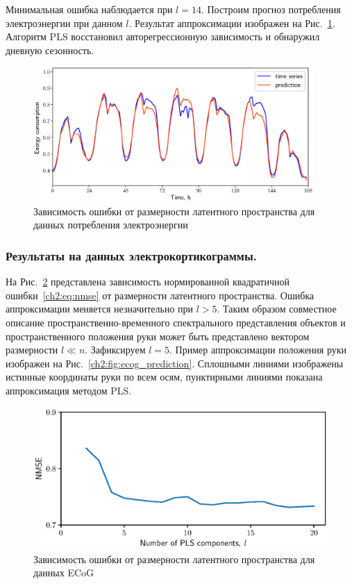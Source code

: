 Минимальная ошибка наблюдается при $l=14$. 
Построим прогноз потребления электроэнергии при данном $l$. 
Результат аппроксимации изображен на Рис.~\ref{ch2:fig:energy_prediction}. Алгоритм PLS восстановил авторегрессионную зависимость и обнаружил дневную сезонность.

\begin{figure}[ht]
	\centering
	\includegraphics[width=0.95\textwidth]{figs/ch2/energy_prediction}
	\caption{Зависимость ошибки от размерности латентного пространства для данных потребления электроэнергии}
	\label{ch2:fig:energy_prediction}
\end{figure}

\subsubsection{Результаты на данных электрокортикограммы.}
На Рис.~\ref{ch2:fig:ecog_n_comp} представлена зависимость нормированной квадратичной ошибки~\eqref{ch2:eq:nmse} от размерности латентного пространства. Ошибка аппроксимации меняется незначительно при $l > 5$.
Таким образом совместное описание пространственно-временного спектрального представления объектов и пространственного положения руки может быть представлено вектором размерности $l \ll n$.
Зафиксируем $l = 5$. 
Пример аппроксимации положения руки изображен на Рис.~\ref{ch2:fig:ecog_prediction}. 
Сплошными линиями изображены истинные координаты руки по всем осям, пунктирными линиями показана аппроксимация методом PLS.
 
\begin{figure}[ht]
	\centering
	\includegraphics[width=0.75\linewidth]{figs/ch2/ecog_n_comp}	
	\caption{Зависимость ошибки от размерности латентного пространства для данных ECoG}
	\label{ch2:fig:ecog_n_comp}
\end{figure}

